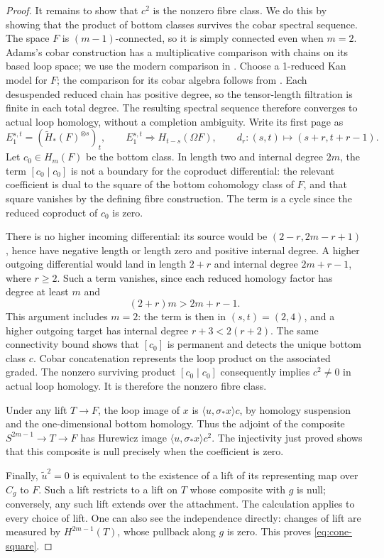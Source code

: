 \begin{proof}
It remains to show that \(c^2\) is the nonzero fibre class. We do this
by showing that the product of bottom classes survives the cobar
spectral sequence. The space \(F\) is
\((m-1)\)-connected, so it is simply connected even when \(m=2\).
Adams's cobar construction \cite{Adams1956} has a multiplicative
comparison with chains on its based loop space; we use the modern
comparison in \cite[Theorem~1]{Rivera2019}. Choose a 1-reduced Kan
model for \(F\); the comparison for its cobar algebra follows from
\cite[Corollary~8 and Theorem~9]{Rivera2019}. Each desuspended
reduced chain has positive degree, so
the tensor-length filtration is finite in each total degree. The
resulting spectral sequence therefore converges to actual loop
homology, without a completion ambiguity. Write its first page as
\[
 E_1^{s,t}=(\widetilde H_*(F)^{\otimes s})_t,
 \qquad E_1^{s,t}\Longrightarrow H_{t-s}(\Omega F),
 \qquad d_r:(s,t)\longmapsto(s+r,t+r-1).
\]
Let \(c_0\in H_m(F)\) be the bottom class. In length two and
internal degree \(2m\), the term
\([c_0\mid c_0]\) is not a boundary for the coproduct differential:
the relevant coefficient is dual to the square of the bottom
cohomology class of \(F\), and that square vanishes by the defining
fibre construction. The term is a cycle since the reduced coproduct
of \(c_0\) is zero.

There is no higher incoming differential: its source would be
\((2-r,2m-r+1)\), hence have negative length or length zero and
positive internal degree. A higher outgoing differential
would land in length \(2+r\) and internal degree \(2m+r-1\), where
\(r\ge2\). Such a term vanishes, since each reduced homology factor
has degree at least \(m\) and
\[
(2+r)m>2m+r-1.
\]
This argument includes \(m=2\): the term is then in \((s,t)=(2,4)\),
and a higher outgoing target has internal degree \(r+3<2(r+2)\).
The same connectivity bound shows that \([c_0]\) is permanent and
detects the unique bottom class \(c\). Cobar concatenation represents
the loop product on the associated graded. The nonzero surviving
product \([c_0\mid c_0]\) consequently implies \(c^2\ne0\) in
actual loop homology. It is therefore the nonzero fibre class.

Under any lift \(T\to F\), the loop image of \(x\) is
\(\langle u,\sigma_*x\rangle c\), by homology suspension and the
one-dimensional bottom homology. Thus the adjoint of the composite
\(S^{2m-1}\to T\to F\) has Hurewicz image
\(\langle u,\sigma_*x\rangle c^2\). The injectivity just proved
shows that this composite is null precisely when the coefficient is zero.

Finally, \(\widetilde u^2=0\) is equivalent to the existence of a lift
of its representing map over \(C_g\) to \(F\). Such a lift restricts
to a lift on \(T\) whose composite with \(g\) is null; conversely,
any such lift extends over the attachment. The calculation applies to
every choice of lift. One can also see the independence directly:
changes of lift are measured by \(H^{2m-1}(T)\), whose pullback along
\(g\) is zero. This proves \eqref{eq:cone-square}.
\end{proof}


